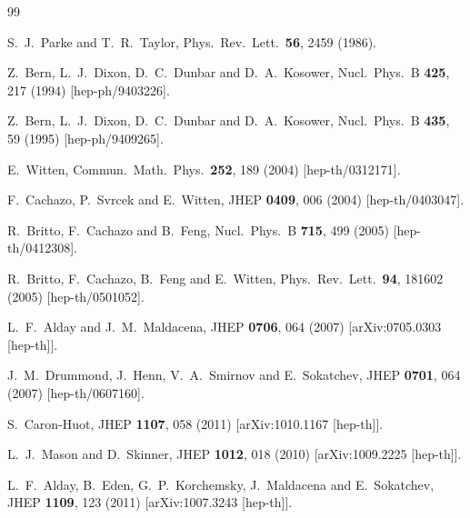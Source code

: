 \documentclass[12pt,nohyper,twosided]{JHEP3}
\begin{document}
\begin{thebibliography}{99}

  S.~J.~Parke and T.~R.~Taylor,
  Phys.\ Rev.\ Lett.\  {\bf 56}, 2459 (1986).

  Z.~Bern, L.~J.~Dixon, D.~C.~Dunbar and D.~A.~Kosower,
  Nucl.\ Phys.\ B {\bf 425}, 217 (1994)
  [hep-ph/9403226].

  Z.~Bern, L.~J.~Dixon, D.~C.~Dunbar and D.~A.~Kosower,
  Nucl.\ Phys.\ B {\bf 435}, 59 (1995)
  [hep-ph/9409265].

  E.~Witten,
  Commun.\ Math.\ Phys.\  {\bf 252}, 189 (2004)
  [hep-th/0312171].

  F.~Cachazo, P.~Svrcek and E.~Witten,
  JHEP {\bf 0409}, 006 (2004)
  [hep-th/0403047].

  R.~Britto, F.~Cachazo and B.~Feng,
  Nucl.\ Phys.\ B {\bf 715}, 499 (2005)
  [hep-th/0412308].

  R.~Britto, F.~Cachazo, B.~Feng and E.~Witten,
  Phys.\ Rev.\ Lett.\  {\bf 94}, 181602 (2005)
  [hep-th/0501052].


  L.~F.~Alday and J.~M.~Maldacena,
  JHEP {\bf 0706}, 064 (2007)
  [arXiv:0705.0303 [hep-th]].

  J.~M.~Drummond, J.~Henn, V.~A.~Smirnov and E.~Sokatchev,
  JHEP {\bf 0701}, 064 (2007)
  [hep-th/0607160].

  S.~Caron-Huot,
  JHEP {\bf 1107}, 058 (2011)
  [arXiv:1010.1167 [hep-th]].

  L.~J.~Mason and D.~Skinner,
  JHEP {\bf 1012}, 018 (2010)
  [arXiv:1009.2225 [hep-th]].

  L.~F.~Alday, B.~Eden, G.~P.~Korchemsky, J.~Maldacena and E.~Sokatchev,
  JHEP {\bf 1109}, 123 (2011)
  [arXiv:1007.3243 [hep-th]].


\end{thebibliography}
\end{document}
